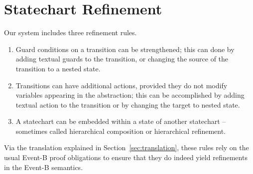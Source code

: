 
\section{Statechart Refinement}
\label{sec:scref}

Our system includes three refinement rules.

\begin{enumerate}
\item Guard conditions on a transition can be strengthened;
this can done by adding textual guards to the transition, or
changing the source of the transition to a nested state.
\item Transitions can have additional actions, provided they do not
  modify variables appearing in the abstraction; this can be
  accomplished by adding textual action to the transition
  or by changing the target to nested state.
\item A statechart can be embedded within a state of another
  statechart -- sometimes called hierarchical composition or
  hierarchical refinement.
\end{enumerate}

Via the translation explained in Section~\ref{sec:translation}, these rules
rely on the usual Event-B proof obligations to ensure that they do
indeed yield refinements in the Event-B semantics.




